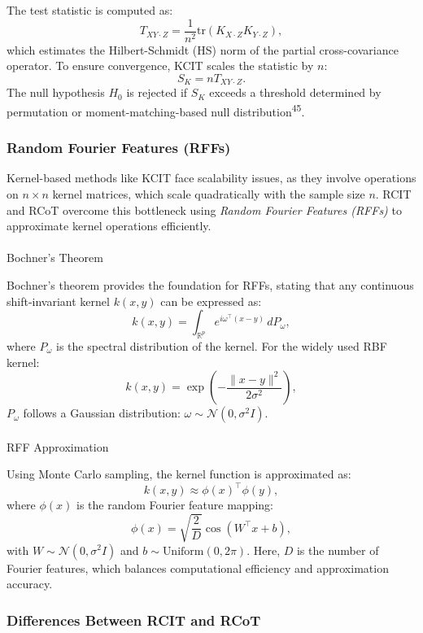 \documentclass[
]{article}
\makeatletter
\let\oldparagraph\paragraph
\renewcommand{\paragraph}{
    \@ifstar
      \xxxParagraphStar
      \xxxParagraphNoStar
  }
\newcommand{\xxxParagraphStar}[1]{\oldparagraph*{#1}\mbox{}}
\newcommand{\xxxParagraphNoStar}[1]{\oldparagraph{#1}\mbox{}}
\makeatother
\begin{document}
The test statistic is computed as: \[
T_{XY \cdot Z} = \frac{1}{n^2} \text{tr}(K_{X \cdot Z} K_{Y \cdot Z}),
\] which estimates the Hilbert-Schmidt (HS) norm of the partial
cross-covariance operator. To ensure convergence, KCIT scales the
statistic by \(n\): \[
S_K = n T_{XY \cdot Z}.
\] The null hypothesis \(H_0\) is rejected if \(S_K\) exceeds a
threshold determined by permutation or moment-matching-based null
distribution\textsuperscript{45}.

\subsubsection{Random Fourier Features
(RFFs)}\label{random-fourier-features-rffs}

Kernel-based methods like KCIT face scalability issues, as they involve
operations on \(n \times n\) kernel matrices, which scale quadratically
with the sample size \(n\). RCIT and RCoT overcome this bottleneck using
\emph{Random Fourier Features (RFFs)} to approximate kernel operations
efficiently.

\paragraph{Bochner's Theorem}\label{bochners-theorem}

Bochner's theorem provides the foundation for RFFs, stating that any
continuous shift-invariant kernel \(k(x, y)\) can be expressed as: \[
k(x, y) = \int_{\mathbb{R}^p} e^{i \omega^\top (x - y)} \, dP_\omega,
\] where \(P_\omega\) is the spectral distribution of the kernel. For
the widely used RBF kernel: \[
k(x, y) = \exp\left(-\frac{\|x - y\|^2}{2\sigma^2}\right),
\] \(P_\omega\) follows a Gaussian distribution:
\(\omega \sim \mathcal{N}(0, \sigma^2 I)\).

\paragraph{RFF Approximation}\label{rff-approximation}

Using Monte Carlo sampling, the kernel function is approximated as: \[
k(x, y) \approx \phi(x)^\top \phi(y),
\] where \(\phi(x)\) is the random Fourier feature mapping: \[
\phi(x) = \sqrt{\frac{2}{D}} \cos(W^\top x + b),
\] with \(W \sim \mathcal{N}(0, \sigma^2 I)\) and
\(b \sim \text{Uniform}(0, 2\pi)\). Here, \(D\) is the number of Fourier
features, which balances computational efficiency and approximation
accuracy.

\subsubsection{Differences Between RCIT and
RCoT}\label{differences-between-rcit-and-rcot}
\end{document}
